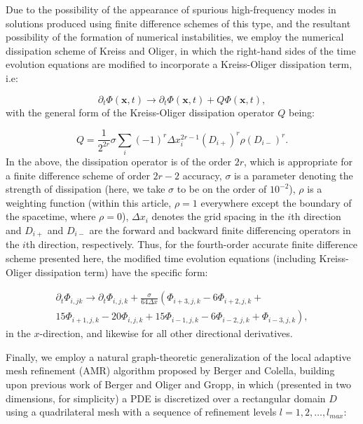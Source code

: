 \documentclass{article}
\begin{document}
Due to the possibility of the appearance of spurious high-frequency modes in solutions produced using finite difference schemes of this type, and the resultant possibility of the formation of numerical instabilities, we employ the numerical dissipation scheme of Kreiss and Oliger\cite{kreiss}, in which the right-hand sides of the time evolution equations are modified to incorporate a Kreiss-Oliger dissipation term, i.e:

\begin{equation}
\partial_t \Phi \left( \mathbf{x}, t \right) \to \partial_t \Phi \left( \mathbf{x}, t \right) + Q \Phi \left( \mathbf{x}, t \right),
\end{equation}
with the general form of the Kreiss-Oliger dissipation operator $Q$ being:

\begin{equation}
Q = \frac{1}{2^{2 r}} \sigma \sum_{i} \left( -1 \right)^r \Delta x_{i}^{2r - 1} \left( D_{i +} \right)^r \rho \left( D_{i -} \right)^r.
\end{equation}
In the above, the dissipation operator is of the order ${2 r}$, which is appropriate for a finite difference scheme of order ${2 r - 2}$ accuracy, ${\sigma}$ is a parameter denoting the strength of dissipation (here, we take ${\sigma}$ to be on the order of ${10^{-2}}$), ${\rho}$ is a weighting function (within this article, ${\rho = 1}$ everywhere except the boundary of the spacetime, where ${\rho = 0}$), ${\Delta x_i}$ denotes the grid spacing in the $i$th direction and ${D_{i +}}$ and ${D_{i -}}$ are the forward and backward finite differencing operators in the $i$th direction, respectively. Thus, for the fourth-order accurate finite difference scheme presented here, the modified time evolution equations (including Kreiss-Oliger dissipation term) have the specific form:

\begin{multline}
\partial_t \Phi_{i, j k} \to \partial_t \Phi_{i, j, k} + \frac{\sigma}{64 \Delta x} \left( \Phi_{i + 3, j, k} - 6 \Phi_{i + 2, j, k} + \right.\\
\left. 15 \Phi_{i + 1, j, k} - 20 \Phi_{i, j, k} +15 \Phi_{i - 1, j, k} - 6 \Phi_{i - 2, j, k} + \Phi_{i - 3, j, k} \right),
\end{multline}
in the $x$-direction, and likewise for all other directional derivatives.

Finally, we employ a natural graph-theoretic generalization of the local adaptive mesh refinement (AMR) algorithm proposed by Berger and Colella\cite{berger}, building upon previous work of Berger and Oliger\cite{berger2} and Gropp\cite{gropp}, in which (presented in two dimensions, for simplicity) a PDE is discretized over a rectangular domain $D$ using a quadrilateral mesh with a sequence of refinement levels ${l = 1, 2, \dots, l_{max}}$:
\end{document}
